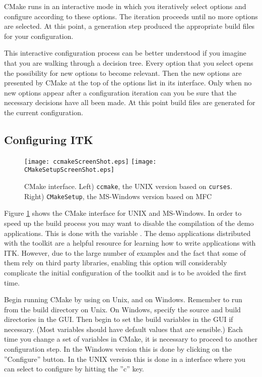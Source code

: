 CMake runs in an interactive mode in which you iteratively select options and
configure according to these options. The iteration proceeds until no more
options are selected. At this point, a generation step produced the appropriate
build files for your configuration.

This interactive configuration process can be better understood if you
imagine that you are walking through a decision tree.  Every option that you
select opens the possibility for new options to become relevant. Then the new
options are presented by CMake at the top of the options list in its
interface.  Only when no new options appear after a configuration iteration
can you be sure that the necessary decisions have all been made. At this point
build files are generated for the current configuration.

\subsection{Configuring ITK}
\label{sec:ConfiguringITKwithVTK}
  

\begin{figure}[ht]
\centering 
\texttt{[image: ccmakeScreenShot.eps]}
\texttt{[image: CMakeSetupScreenShot.eps]}
\caption{CMake interface. Left) \texttt{ccmake}, the UNIX version based on
\texttt{curses}. Right) \texttt{CMakeSetup}, the MS-Windows version based on MFC}
\label{fig:CMakeGUI}
\end{figure}

Figure \ref{fig:CMakeGUI} shows the CMake interface for UNIX and MS-Windows.
In order to speed up the build process you may want to disable the
compilation of the demo applications. This is done with the variable
. The demo applications  distributed with the
toolkit are a helpful resource for learning how to write applications with
ITK.  However, due to the large number of examples and the fact that some of
them rely on third party libraries, enabling this option will considerably
complicate the initial configuration of the toolkit and is to be avoided the
first time.

Begin running CMake by using  on Unix, and  on
Windows. Remember to run  from the build directory on Unix. On
Windows, specify the source and build directories in the GUI. Then begin to
set the build variables in the GUI if necessary.  (Most variables should have
default values that are sensible.) Each time you change a set of variables in
CMake, it is necessary to proceed to another configuration step. In the
Windows version this is done by clicking on the ''Configure'' button. In the
UNIX version this is done in a
 interface where you can select to configure by hitting the
''c'' key.

